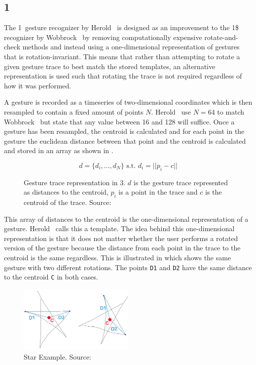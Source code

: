 \subsection{1\textcent}

The 1\textcent~gesture recognizer by Herold \etal~is designed as an improvement to the 1\$ recognizer \cite{wobbrock2007gestures} by Wobbrock \etal~by removing computationally expensive rotate-and-check methods and instead using a one-dimensional representation of gestures that is rotation-invariant.
This means that rather than attempting to rotate a given gesture trace to best match the stored templates, an alternative representation is used such that rotating the trace is not required regardless of how it was performed.

A gesture is recorded as a timeseries of two-dimensional coordinates which is then resampled to contain a fixed amount of points $N$.
Herold \etal~use $N = 64$ to match Wobbrock \etal~but state that any value between 16 and 128 will suffice.
Once a gesture has been resampled, the centroid is calculated and for each point in the gesture the euclidean distance between that point and the centroid is calculated and stored in an array as shown in .

\begin{figure}[h]
\[ d = \{d_i,\ldots,d_N\} \text{ s.t. } d_i=||p_i-c|| \]
\caption{Gesture trace representation in 3\textcent. $d$ is the gesture trace represented as distances to the centroid, $p_i$ is a point in the trace and $c$ is the centroid of the trace. Source:~\cite{herold20121}}
\label{eq:one-cent-trace}
\end{figure}

This array of distances to the centroid is the one-dimensional representation of a gesture. Herold \etal~calls this a template.
The idea behind this one-dimensional representation is that it does not matter whether the user performs a rotated version of the gesture because the distance from each point in the trace to the centroid is the same regardless.
This is illustrated in  which shows the same gesture with two different rotations.
The points \texttt{D1} and \texttt{D2} have the same distance to the centroid \texttt{C} in both cases.

\begin{figure}[h]
\centering
\includegraphics[width=0.5\textwidth]{images/one-cent-star-example}
\caption{Star Example. Source:~\cite{herold20121}}
\label{fig:one-cent-star}
\end{figure}

